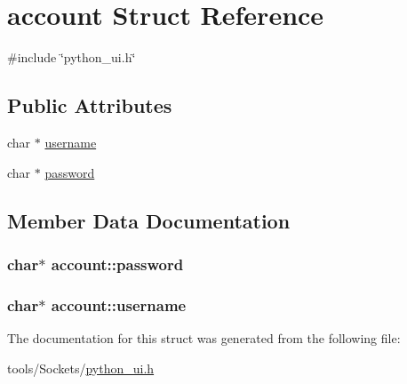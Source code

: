\hypertarget{structaccount}{\section{account Struct Reference}
\label{structaccount}
}


{\ttfamily \#include \char`\"{}python\-\_\-ui.\-h\char`\"{}}

\subsection*{Public Attributes}
\begin{DoxyCompactItemize}
\item 
char $\ast$ \hyperlink{structaccount_a325798a51033aaf88ae50608fab1a3f1}{username}
\item 
char $\ast$ \hyperlink{structaccount_a6c90bcc4fd2327c680f4f7bfaaf70755}{password}
\end{DoxyCompactItemize}


\subsection{Member Data Documentation}
\hypertarget{structaccount_a6c90bcc4fd2327c680f4f7bfaaf70755}{
\subsubsection[{password}]{\setlength{\rightskip}{0pt plus 5cm}char$\ast$ account\-::password}}\label{structaccount_a6c90bcc4fd2327c680f4f7bfaaf70755}
\hypertarget{structaccount_a325798a51033aaf88ae50608fab1a3f1}{
\subsubsection[{username}]{\setlength{\rightskip}{0pt plus 5cm}char$\ast$ account\-::username}}\label{structaccount_a325798a51033aaf88ae50608fab1a3f1}


The documentation for this struct was generated from the following file\-:\begin{DoxyCompactItemize}
\item 
tools/\-Sockets/\hyperlink{python__ui_8h}{python\-\_\-ui.\-h}\end{DoxyCompactItemize}
